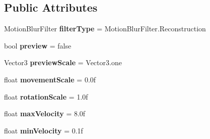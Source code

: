 \subsection*{Public Attributes}
\begin{DoxyCompactItemize}
\item 
Motion\+Blur\+Filter {\bfseries filter\+Type} = Motion\+Blur\+Filter.\+Reconstruction\hypertarget{class_unity_standard_assets_1_1_image_effects_1_1_camera_motion_blur_a4095304016808a9b9370e6c41bba8a8c}{}\label{class_unity_standard_assets_1_1_image_effects_1_1_camera_motion_blur_a4095304016808a9b9370e6c41bba8a8c}

\item 
bool {\bfseries preview} = false\hypertarget{class_unity_standard_assets_1_1_image_effects_1_1_camera_motion_blur_aa66a7358f181c0bdcbf9ed8ff4a2e394}{}\label{class_unity_standard_assets_1_1_image_effects_1_1_camera_motion_blur_aa66a7358f181c0bdcbf9ed8ff4a2e394}

\item 
Vector3 {\bfseries preview\+Scale} = Vector3.\+one\hypertarget{class_unity_standard_assets_1_1_image_effects_1_1_camera_motion_blur_acbfb02a03910f99d28ffc86e04243631}{}\label{class_unity_standard_assets_1_1_image_effects_1_1_camera_motion_blur_acbfb02a03910f99d28ffc86e04243631}

\item 
float {\bfseries movement\+Scale} = 0.\+0f\hypertarget{class_unity_standard_assets_1_1_image_effects_1_1_camera_motion_blur_a6d2abe2f75c13d9dae5b5b9dc9fc74ea}{}\label{class_unity_standard_assets_1_1_image_effects_1_1_camera_motion_blur_a6d2abe2f75c13d9dae5b5b9dc9fc74ea}

\item 
float {\bfseries rotation\+Scale} = 1.\+0f\hypertarget{class_unity_standard_assets_1_1_image_effects_1_1_camera_motion_blur_a3d08bc6c65aad2fe3e48abcb2bc23029}{}\label{class_unity_standard_assets_1_1_image_effects_1_1_camera_motion_blur_a3d08bc6c65aad2fe3e48abcb2bc23029}

\item 
float {\bfseries max\+Velocity} = 8.\+0f\hypertarget{class_unity_standard_assets_1_1_image_effects_1_1_camera_motion_blur_a7995452c9a8ab59e2d6f1767381fe567}{}\label{class_unity_standard_assets_1_1_image_effects_1_1_camera_motion_blur_a7995452c9a8ab59e2d6f1767381fe567}

\item 
float {\bfseries min\+Velocity} = 0.\+1f\hypertarget{class_unity_standard_assets_1_1_image_effects_1_1_camera_motion_blur_ae6e4436e252dda38e280d2ea557a9582}{}\label{class_unity_standard_assets_1_1_image_effects_1_1_camera_motion_blur_ae6e4436e252dda38e280d2ea557a9582}


\end{DoxyCompactItemize}
